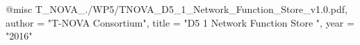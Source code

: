 @misc{ T_NOVA_./WP5/TNOVA_D5_1_Network_Function_Store_v1.0.pdf,
       author = "{T-NOVA Consortium}",
       title = "D5 1 Network Function Store ",
       year = "2016" }
